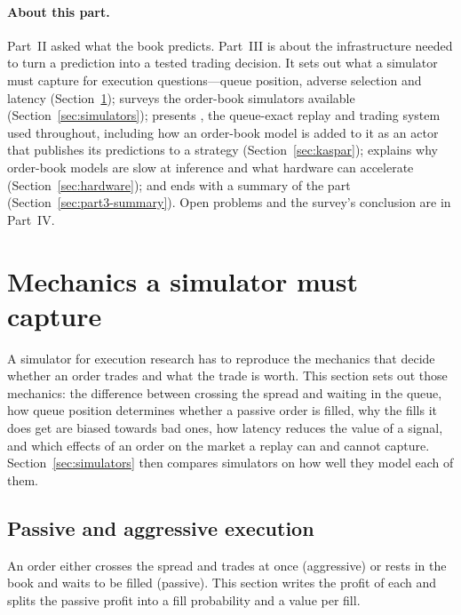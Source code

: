 \paragraph{About this part.} Part~II asked what the book predicts. Part~III is about the infrastructure needed to
turn a prediction into a tested trading decision. It sets out what a simulator must capture for execution
questions---queue position, adverse selection and latency (Section~\ref{sec:sim-needs}); surveys the order-book
simulators available (Section~\ref{sec:simulators}); presents \kasparhft{}, the queue-exact replay and trading system used
throughout, including how an order-book model is added to it as an actor that publishes its predictions to a strategy
(Section~\ref{sec:kaspar}); explains why order-book
models are slow at inference and what hardware can accelerate (Section~\ref{sec:hardware}); and ends with a summary
of the part (Section~\ref{sec:part3-summary}). Open problems and the survey's conclusion are in Part~IV.

\section{Mechanics a simulator must capture}
\label{sec:sim-needs}

A simulator for execution research has to reproduce the mechanics that decide whether an order trades and what
the trade is worth. This section sets out those mechanics: the difference between crossing the spread and
waiting in the queue, how queue position determines whether a passive order is filled, why the fills it does get
are biased towards bad ones, how latency reduces the value of a signal, and which effects of an order on the market a
replay can and cannot capture. Section~\ref{sec:simulators} then
compares simulators on how well they model each of them.

\subsection{Passive and aggressive execution}
\label{sec:passive}

An order either crosses the spread and trades at once (aggressive) or rests in the book and waits to be filled
(passive). This section writes the profit of each and splits the passive profit into a fill probability and a value
per fill.

